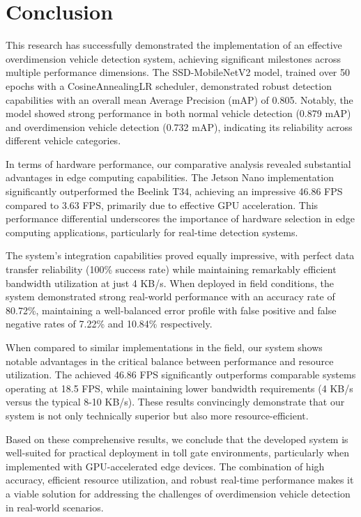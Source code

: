 \section{Conclusion}
\label{sec:conclusion}

This research has successfully demonstrated the implementation of an effective overdimension vehicle detection system, achieving significant milestones across multiple performance dimensions. The SSD-MobileNetV2 model, trained over 50 epochs with a CosineAnnealingLR scheduler, demonstrated robust detection capabilities with an overall mean Average Precision (mAP) of 0.805. Notably, the model showed strong performance in both normal vehicle detection (0.879 mAP) and overdimension vehicle detection (0.732 mAP), indicating its reliability across different vehicle categories.

In terms of hardware performance, our comparative analysis revealed substantial advantages in edge computing capabilities. The Jetson Nano implementation significantly outperformed the Beelink T34, achieving an impressive 46.86 FPS compared to 3.63 FPS, primarily due to effective GPU acceleration. This performance differential underscores the importance of hardware selection in edge computing applications, particularly for real-time detection systems.

The system's integration capabilities proved equally impressive, with perfect data transfer reliability (100\% success rate) while maintaining remarkably efficient bandwidth utilization at just 4 KB/s. When deployed in field conditions, the system demonstrated strong real-world performance with an accuracy rate of 80.72\%, maintaining a well-balanced error profile with false positive and false negative rates of 7.22\% and 10.84\% respectively.

When compared to similar implementations in the field, our system shows notable advantages in the critical balance between performance and resource utilization. The achieved 46.86 FPS significantly outperforms comparable systems operating at 18.5 FPS, while maintaining lower bandwidth requirements (4 KB/s versus the typical 8-10 KB/s). These results convincingly demonstrate that our system is not only technically superior but also more resource-efficient.

Based on these comprehensive results, we conclude that the developed system is well-suited for practical deployment in toll gate environments, particularly when implemented with GPU-accelerated edge devices. The combination of high accuracy, efficient resource utilization, and robust real-time performance makes it a viable solution for addressing the challenges of overdimension vehicle detection in real-world scenarios.

